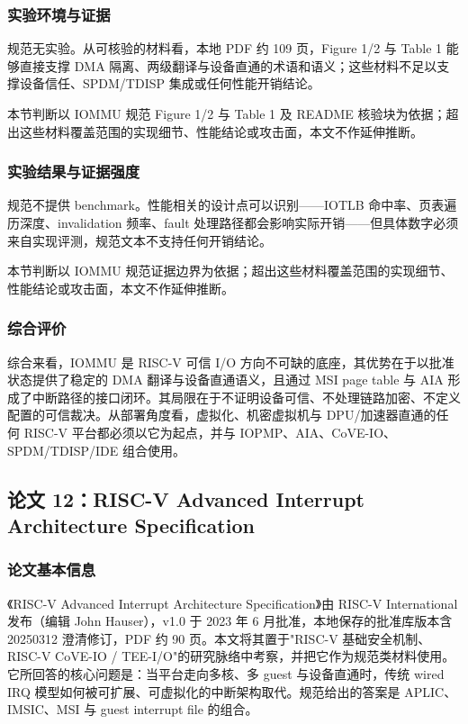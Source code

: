 \documentclass[11pt]{ctexart}
\begin{document}
\subsubsection{实验环境与证据}
规范无实验。从可核验的材料看，本地 PDF 约 109 页，Figure 1/2 与 Table 1 能够直接支撑 DMA 隔离、两级翻译与设备直通的术语和语义；这些材料不足以支撑设备信任、SPDM/TDISP 集成或任何性能开销结论。\par
本节判断以 IOMMU 规范 Figure 1/2 与 Table 1 及 README 核验块为依据；超出这些材料覆盖范围的实现细节、性能结论或攻击面，本文不作延伸推断。\par
\subsubsection{实验结果与证据强度}
规范不提供 benchmark。性能相关的设计点可以识别——IOTLB 命中率、页表遍历深度、invalidation 频率、fault 处理路径都会影响实际开销——但具体数字必须来自实现评测，规范文本不支持任何开销结论。\par
本节判断以 IOMMU 规范证据边界为依据；超出这些材料覆盖范围的实现细节、性能结论或攻击面，本文不作延伸推断。\par
\subsubsection{综合评价}
综合来看，IOMMU 是 RISC-V 可信 I/O 方向不可缺的底座，其优势在于以批准状态提供了稳定的 DMA 翻译与设备直通语义，且通过 MSI page table 与 AIA 形成了中断路径的接口闭环。其局限在于不证明设备可信、不处理链路加密、不定义配置的可信裁决。从部署角度看，虚拟化、机密虚拟机与 DPU/加速器直通的任何 RISC-V 平台都必须以它为起点，并与 IOPMP、AIA、CoVE-IO、SPDM/TDISP/IDE 组合使用。\par
\subsection{论文 12：RISC-V Advanced Interrupt Architecture Specification}
\subsubsection{论文基本信息}
《RISC-V Advanced Interrupt Architecture Specification》由 RISC-V International 发布（编辑 John Hauser），v1.0 于 2023 年 6 月批准，本地保存的批准库版本含 20250312 澄清修订，PDF 约 90 页。本文将其置于"RISC-V 基础安全机制、RISC-V CoVE-IO / TEE-I/O"的研究脉络中考察，并把它作为规范类材料使用。它所回答的核心问题是：当平台走向多核、多 guest 与设备直通时，传统 wired IRQ 模型如何被可扩展、可虚拟化的中断架构取代。规范给出的答案是 APLIC、IMSIC、MSI 与 guest interrupt file 的组合。\cite{riscv_aia_2023}\par
\end{document}
